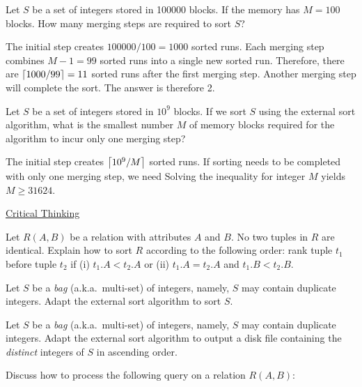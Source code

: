  Let $S$ be a set of integers stored in 100000 blocks. If the memory has $M = 100$ blocks. How many merging steps are required to sort $S$?

\begin{sol}
 The initial step creates $100000/100 = 1000$ sorted runs. Each merging step combines $M - 1 = 99$ sorted runs into a single new sorted run. Therefore, there are $\left \lceil 1000/99 \right \rceil = 11$ sorted runs after the first merging step. Another merging step will complete the sort. The answer is therefore 2.
\end{sol}

 Let $S$ be a set of integers stored in $10^9$ blocks. If we sort $S$ using the external sort algorithm, what is the smallest number $M$ of memory blocks required for the algorithm to incur only one merging step?

\begin{sol}
 The initial step creates $\left \lceil 10^9 / M \right \rceil$ sorted runs. If sorting needs to be completed with only one merging step, we need
Solving the inequality for integer $M$ yields $M \ge 31624$.

\end{sol}

\begin{center}
    \uline{Critical Thinking}
\end{center}

 Let $R(A, B)$ be a relation with attributes $A$ and $B$. No two tuples in $R$ are identical. Explain how to sort $R$ according to the following order: rank tuple $t_1$ before tuple $t_2$ if (i) $t_1.A < t_2.A$ or (ii) $t_1.A = t_2.A$ and $t_1.B < t_2.B$.

 Let $S$ be a {\em bag} (a.k.a.\ multi-set) of integers, namely, $S$ may contain duplicate integers. Adapt the external sort algorithm to sort $S$.

 Let $S$ be a {\em bag} (a.k.a.\ multi-set) of integers, namely, $S$ may contain duplicate integers. Adapt the external sort algorithm to output a disk file containing the {\em distinct} integers of $S$ in ascending order.

 Discuss how to process the following query on a relation $R(A, B)$:



